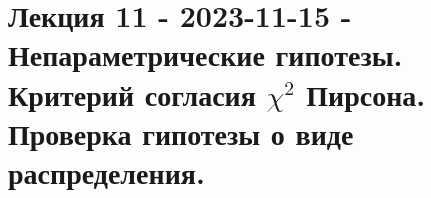 \section{Лекция 11 - 2023-11-15 - Непараметрические гипотезы. Критерий согласия $\chi^2$ Пирсона. Проверка гипотезы о виде распределения.}
